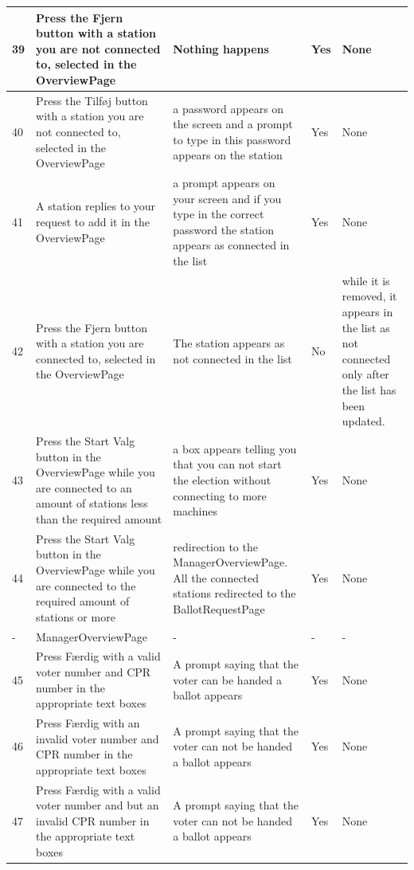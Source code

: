 \documentclass[a4paper]{report}
\begin{document}
\begin{longtable}{|p{5mm}|p{}|p{}|p{}|p{}|}
 \\\hline
39 & Press the Fjern button with a station you are not connected to, selected in the OverviewPage & Nothing happens & Yes & None

 \\\hline
40 & Press the Tilf\o j button with a station you are not connected to, selected in the OverviewPage & a password appears on the screen and a prompt to type in this password appears on the station & Yes & None 

 \\\hline
41 & A station replies to your request to add it in the OverviewPage & a prompt appears on your screen and if you type in the correct password the station appears as connected in the list & Yes & None 

\\\hline
42 & Press the Fjern button with a station you are connected to, selected in the OverviewPage & The station appears as not connected in the list & No & while it is removed, it appears in the list as not connected only after the list has been updated. 

\\\hline
43 & Press the Start Valg button in the OverviewPage while you are connected to an amount of stations less than the required amount & a box appears telling you that you can not start the election without connecting to more machines & Yes & None 

\\\hline
44 & Press the Start Valg button in the OverviewPage while you are connected to the required amount of stations or more & redirection to the ManagerOverviewPage. All the connected stations redirected to the BallotRequestPage & Yes & None 

\\\hline
- & ManagerOverviewPage & - & - & -

 \\\hline
45 & Press F\ae rdig with a valid voter number and CPR number in the appropriate text boxes & A prompt saying that the voter can be handed a ballot appears & Yes & None 

 \\\hline
46 & Press F\ae rdig with an invalid voter number and CPR number in the appropriate text boxes & A prompt saying that the voter can not be handed a ballot appears & Yes & None 

 \\\hline
47 & Press F\ae rdig with a valid voter number and but an invalid CPR number in the appropriate text boxes & A prompt saying that the voter can not be handed a ballot appears & Yes & None 


\end{longtable}
\end{document}

